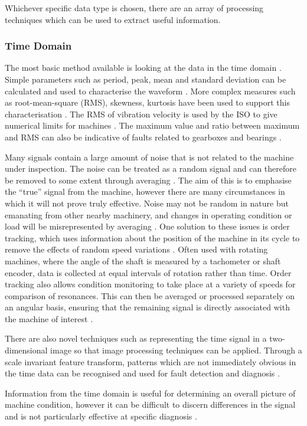 Whichever specific data type is chosen, there are an array of processing techniques which can be used to extract useful information.

\subsubsection{Time Domain}

The most basic method available is looking at the data in the time domain \cite{CM_randall}.
Simple parameters such as period, peak, mean and standard deviation can be calculated and used to characterise the waveform \cite{CM_dai_gao_2013}.
More complex measures such as root-mean-square (RMS), skewness, kurtosis have been used to support this characterisation \cite{CM_dai_gao_2013}.
The RMS of vibration velocity is used by the ISO to give numerical limits for machines \cite{ISO10816-7}.
The maximum value and ratio between maximum and RMS can also be indicative of faults related to gearboxes and bearings \cite{VIB_rms}\cite{ISO13373-3}.
\par

Many signals contain a large amount of noise that is not related to the machine under inspection.
The noise can be treated as a random signal and can therefore be removed to some extent through averaging \cite{CM_randall}.
The aim of this is to emphasise the ``true'' signal from the machine, however there are many circumstances in which it will not prove truly effective.
Noise may not be random in nature but emanating from other nearby machinery, and changes in operating condition or load will be misrepresented by averaging \cite{CM_randall}\cite{CM_dai_gao_2013}.
One solution to these issues is order tracking, which uses information about the position of the machine in its cycle to remove the effects of random speed variations \cite{CM_randall}.
Often used with rotating machines, where the angle of the shaft is measured by a tachometer or shaft encoder, data is collected at equal intervals of rotation rather than time.
Order tracking also allows condition monitoring to take place at a variety of speeds for comparison of resonances.
This can then be averaged or processed separately on an angular basis, ensuring that the remaining signal is directly associated with the machine of interest \cite{CM_bonnardot}.
\par

There are also novel techniques such as representing the time signal in a two-dimensional image so that image processing techniques can be applied.
Through a scale invariant feature transform, patterns which are not immediately obvious in the time data can be recognised and used for fault detection and diagnosis \cite{CM_dai_gao_2013}.
\par
Information from the time domain is useful for determining an overall picture of machine condition, however it can be difficult to discern differences in the signal and is not particularly effective at specific diagnosis \cite{CM_randall}.

